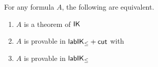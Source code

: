 \documentclass[twoside]{aiml20}
\begin{document}
\begin{theorem}\label{thm:cutfree-compl}
	For any formula $A$, the following are equivalent.
	\begin{enumerate}
		\item\label{i} $A$ is a theorem of $\mathsf{IK}$ 
		\item\label{ii} $A$ is provable in $\mathsf{lab}\mathsf{IK}_{\le} +\mathsf{cut}_{}$ with %
		\smash{%
			\scalebox{.9}{$\vliinf{\labrn{cut}}{}{\B_1, \B_2, \Left \SEQ \Right}{\B_1, \Left \SEQ \Right, \labels{z}{C}}{\B_2, \Left, \labels{z}{C} \SEQ \Right}$}
		}%
		\item\label{iii} $A$ is provable in $\mathsf{lab}\mathsf{IK}_{\le}$
	\end{enumerate}
\end{theorem}
\end{document}
